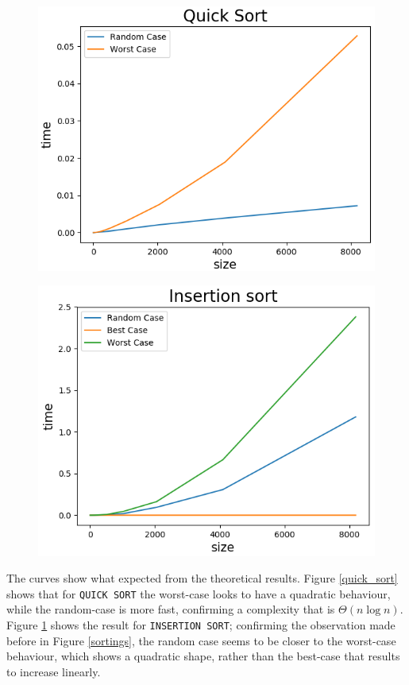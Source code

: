 \documentclass{article}
\begin{document}
	\newpage
	\begin{figure}[h]
		\hspace*{-3cm} 
		\begin{minipage}{.75\textwidth}
			\centering
			\includegraphics[width=.7\linewidth]{../plots/quick_sort_plot.png}
			\label{quick_sort}
		\end{minipage}%
	    \hspace*{-1.5cm} 
		\begin{minipage}{.75\textwidth}
			\centering
			\includegraphics[width=.7\linewidth]{../plots/insertion_sort_plot.png}
			\label{insertion_sort}
		\end{minipage}
	\end{figure}
	\noindent The curves show what expected from the theoretical results. Figure \ref{quick_sort} shows that for \texttt{QUICK SORT} the worst-case looks to have a quadratic behaviour, while the random-case is more fast, confirming a complexity that is $\Theta(n\log n)$. Figure \ref{insertion_sort} shows the result for \texttt{INSERTION SORT}; confirming the observation made before in Figure \ref{sortings}, the random case seems to be closer to the worst-case behaviour, which shows a quadratic shape, rather than the best-case that results to increase linearly.
\end{document}
